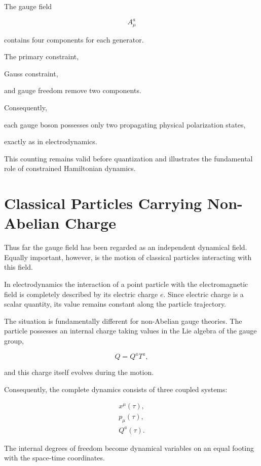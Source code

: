 The gauge field

\[
A_\mu^a
\]

contains four components for each generator.

The primary constraint,

Gauss constraint,

and gauge freedom remove two components.

Consequently,

each gauge boson possesses only two propagating physical polarization
states,

exactly as in electrodynamics.

This counting remains valid before quantization and illustrates the
fundamental role of constrained Hamiltonian dynamics.


\section{Classical Particles Carrying Non-Abelian Charge}

Thus far the gauge field has been regarded as an independent dynamical
field. Equally important, however, is the motion of classical particles
interacting with this field.

In electrodynamics the interaction of a point particle with the
electromagnetic field is completely described by its electric charge
\(e\). Since electric charge is a scalar quantity, its value remains
constant along the particle trajectory.

The situation is fundamentally different for non-Abelian gauge theories.
The particle possesses an internal charge taking values in the Lie
algebra of the gauge group,

\[
Q=Q^aT^a,
\]

and this charge itself evolves during the motion.

Consequently, the complete dynamics consists of three coupled systems:

\[
\begin{aligned}
x^\mu(\tau),\\
p_\mu(\tau),\\
Q^a(\tau).
\end{aligned}
\]

The internal degrees of freedom become dynamical variables on an equal
footing with the space-time coordinates.

